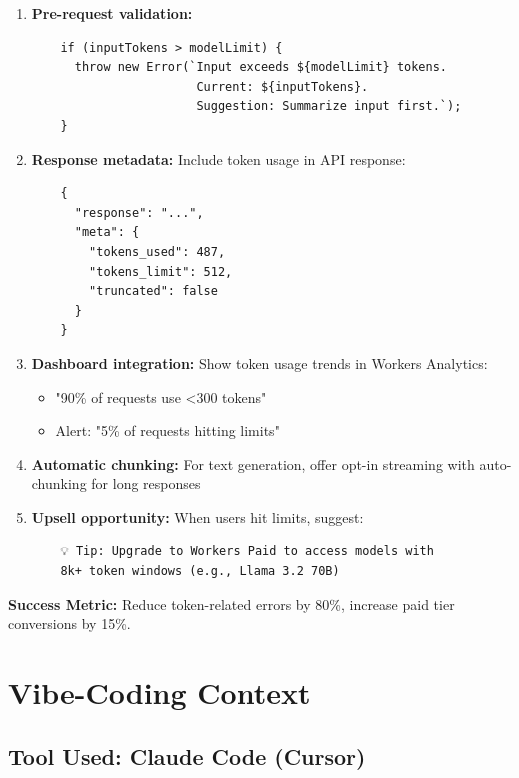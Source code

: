 \documentclass[11pt,a4paper]{article}
\begin{document}
\begin{enumerate}[leftmargin=*, itemsep=0.5em]
    \item \textbf{Pre-request validation:}
    \begin{verbatim}
    if (inputTokens > modelLimit) {
      throw new Error(`Input exceeds ${modelLimit} tokens.
                       Current: ${inputTokens}. 
                       Suggestion: Summarize input first.`);
    }
    \end{verbatim}
    
    \item \textbf{Response metadata:} Include token usage in API response:
    \begin{verbatim}
    {
      "response": "...",
      "meta": {
        "tokens_used": 487,
        "tokens_limit": 512,
        "truncated": false
      }
    }
    \end{verbatim}
    
    \item \textbf{Dashboard integration:} Show token usage trends in Workers Analytics:
    \begin{itemize}
        \item "90\% of requests use <300 tokens"
        \item Alert: "5\% of requests hitting limits"
    \end{itemize}
    
    \item \textbf{Automatic chunking:} For text generation, offer opt-in streaming with auto-chunking for long responses
    
    \item \textbf{Upsell opportunity:} When users hit limits, suggest:
    \begin{verbatim}
    💡 Tip: Upgrade to Workers Paid to access models with
    8k+ token windows (e.g., Llama 3.2 70B)
    \end{verbatim}
\end{enumerate}

\textbf{Success Metric:} Reduce token-related errors by 80\%, increase paid tier conversions by 15\%.

\newpage

\section{Vibe-Coding Context}

\subsection{Tool Used: Claude Code (Cursor)}
\end{document}
